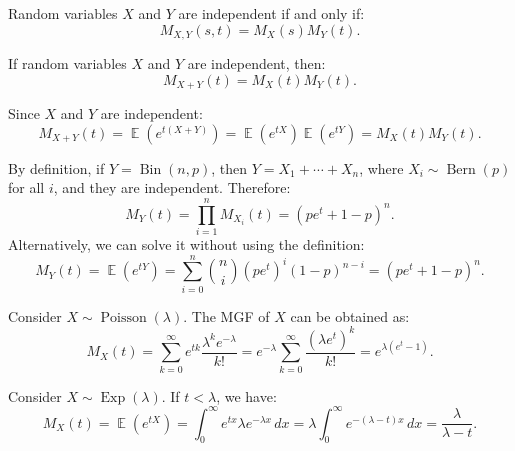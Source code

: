 \documentclass{huhtakm-template-book-v2}
\DeclareMathOperator{\E}{\mathbb{E}}
\DeclareMathOperator{\Bern}{Bern}
\DeclareMathOperator{\Bin}{Bin}
\DeclareMathOperator{\Poisson}{Poisson}
\DeclareMathOperator{\Exp}{Exp}
\begin{document}
    \begin{lem}
        Random variables $X$ and $Y$ are independent if and only if:
        \begin{equation*}
            M_{X,Y}(s, t) = M_{X}(s) M_{Y}(t).
        \end{equation*}
    \end{lem}
    \begin{lem}
        If random variables $X$ and $Y$ are independent, then:
        \begin{equation*}
            M_{X+Y}(t) = M_{X}(t) M_{Y}(t).
        \end{equation*}
    \end{lem}
    \begin{proofing}
        Since $X$ and $Y$ are independent:
        \begin{equation*}
            M_{X+Y}(t) = \E(e^{t(X + Y)}) = \E(e^{tX}) \E(e^{tY}) = M_{X}(t) M_{Y}(t).
        \end{equation*}
    \end{proofing}
    \begin{eg}
        By definition, if $Y = \Bin(n, p)$, then $Y = X_{1} + \cdots + X_{n}$, where $X_{i} \sim \Bern(p)$ for all $i$, and they are independent. Therefore:
        \begin{equation*}
            M_{Y}(t) = \prod_{i=1}^{n} M_{X_{i}}(t) = (pe^{t} + 1 - p)^{n}.
        \end{equation*}
        Alternatively, we can solve it without using the definition:
        \begin{equation*}
            M_{Y}(t) = \E(e^{tY}) = \sum_{i=0}^{n} \binom{n}{i} (pe^{t})^{i} (1 - p)^{n - i} = (pe^{t} + 1 - p)^{n}.
        \end{equation*}
    \end{eg}
    \begin{eg}
        Consider $X \sim \Poisson(\lambda)$. The MGF of $X$ can be obtained as:
        \begin{equation*}
            M_{X}(t) = \sum_{k=0}^{\infty} e^{tk} \frac{\lambda^{k} e^{-\lambda}}{k!} = e^{-\lambda} \sum_{k=0}^{\infty} \frac{(\lambda e^{t})^{k}}{k!} = e^{\lambda(e^{t} - 1)}.
        \end{equation*}
    \end{eg}
    \begin{eg}
        Consider $X \sim \Exp(\lambda)$. If $t < \lambda$, we have:
        \begin{equation*}
            M_{X}(t) = \E(e^{tX}) = \int_{0}^{\infty} e^{tx} \lambda e^{-\lambda x} \, dx = \lambda \int_{0}^{\infty} e^{-(\lambda - t)x} \, dx = \frac{\lambda}{\lambda - t}.
        \end{equation*}
    \end{eg}
\end{document}
